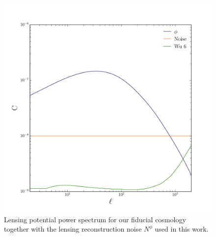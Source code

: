 \documentclass[aps,prl,preprint,groupedaddress]{revtex4-1}
\begin{document}
\begin{figure}[htbp]
\begin{center}
\includegraphics[scale=0.6]{PS_phi_with_noise.pdf}
\caption{Lensing potential power spectrum for our fiducial cosmology together with the lensing reconstruction noise $N^{\phi}$ used in this work.}
\label{fig:phi-cl-noise}
\end{center}
\end{figure}
\end{document}
